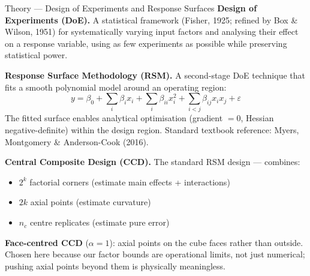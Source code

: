 \documentclass[aspectratio=169,10pt]{beamer}
\begin{document}
\begin{frame}{Theory --- Design of Experiments and Response Surfaces}
  \footnotesize
  \textbf{Design of Experiments (DoE).}
  A statistical framework (Fisher, 1925; refined by Box \& Wilson, 1951) for systematically varying input factors and analysing their effect on a response variable, using as few experiments as possible while preserving statistical power.

  \vspace{0.4em}
  \textbf{Response Surface Methodology (RSM).}
  A second-stage DoE technique that fits a smooth polynomial model around an operating region:
  \[
    y = \beta_0 + \sum_i \beta_i x_i + \sum_i \beta_{ii} x_i^2 + \sum_{i<j} \beta_{ij} x_i x_j + \varepsilon
  \]
  The fitted surface enables analytical optimisation (gradient $= 0$, Hessian negative-definite) within the design region. Standard textbook reference: Myers, Montgomery \& Anderson-Cook (2016).

  \vspace{0.4em}
  \textbf{Central Composite Design (CCD).}
  The standard RSM design --- combines:
  \begin{itemize}
    \item $2^k$ factorial corners (estimate main effects + interactions)
    \item $2k$ axial points (estimate curvature)
    \item $n_c$ centre replicates (estimate pure error)
  \end{itemize}
  \textbf{Face-centred CCD} ($\alpha = 1$): axial points on the cube faces rather than outside. Chosen here because our factor bounds are operational limits, not just numerical; pushing axial points beyond them is physically meaningless.
\end{frame}
\end{document}
